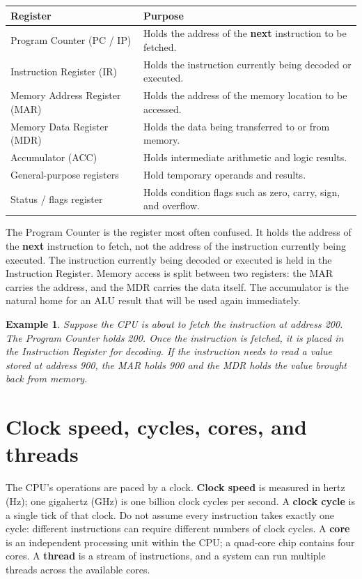 \documentclass[11pt]{article}
\newtheorem{example}{Example}[section]
\begin{document}
\begin{center}
\begin{tabular}{p{}p{}}
\toprule
\textbf{Register} & \textbf{Purpose} \\
\midrule
Program Counter (PC / IP) & Holds the address of the \textbf{next} instruction to be fetched. \\
Instruction Register (IR) & Holds the instruction currently being decoded or executed. \\
Memory Address Register (MAR) & Holds the address of the memory location to be accessed. \\
Memory Data Register (MDR) & Holds the data being transferred to or from memory. \\
Accumulator (ACC) & Holds intermediate arithmetic and logic results. \\
General-purpose registers & Hold temporary operands and results. \\
Status / flags register & Holds condition flags such as zero, carry, sign, and overflow. \\
\bottomrule
\end{tabular}
\end{center}

The Program Counter is the register most often confused. It holds the
address of the \textbf{next} instruction to fetch, not the address of the
instruction currently being executed. The instruction currently being
decoded or executed is held in the Instruction Register. Memory access is
split between two registers: the MAR carries the address, and the MDR carries
the data itself. The accumulator is the natural home for an ALU result that
will be used again immediately.

\begin{example}
Suppose the CPU is about to fetch the instruction at address 200. The
Program Counter holds 200. Once the instruction is fetched, it is placed in
the Instruction Register for decoding. If the instruction needs to read a
value stored at address 900, the MAR holds 900 and the MDR holds the value
brought back from memory.
\end{example}

\section{Clock speed, cycles, cores, and threads}
The CPU's operations are paced by a clock. \textbf{Clock speed} is measured
in hertz (Hz); one gigahertz (GHz) is one billion clock cycles per second. A
\textbf{clock cycle} is a single tick of that clock. Do not assume every
instruction takes exactly one cycle: different instructions can require
different numbers of clock cycles. A \textbf{core} is an independent
processing unit within the CPU; a quad-core chip contains four cores. A
\textbf{thread} is a stream of instructions, and a system can run multiple
threads across the available cores.
\end{document}
